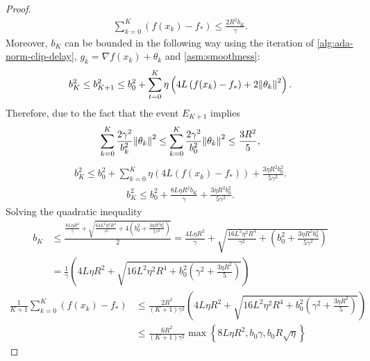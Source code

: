 \documentclass{article}
\begin{document}
\begin{proof}
    \begin{align}
        \sum\limits_{k=0}^{K}\left(f(x_k) - f_*\right) \leq  \frac{2R^2b_{K}}{\gamma}. \label{eq:dnjkfvjkdbfjhvbsjdcbsjd}
    \end{align}
    Moreover, $b_{K}$ can be bounded in the following way using the iteration of \cref{alg:ada-norm-clip-delay}, $g_k = \nabla f(x_k) + \theta_k$ and \cref{asm:smoothness}:
    \begin{align*}
        b_{K}^2 \leq b_{K+1}^2 \leq b_0^2 + \sum\limits_{t=0}^{K}\eta\left(4L\left(f(x_k) - f_*\right) + 2{\left\lVert\theta_k\right\rVert}^2\right).
    \end{align*}
    Therefore, due to the fact that the event $E_{K+1}$ implies 
    \begin{align*}
         \sum\limits_{k=0}^{K} \frac{2\gamma^2}{b_k^2}{\left\lVert\theta_k\right\rVert}^2 \leq \sum\limits_{k=0}^{K} \frac{2\gamma^2}{b_0^2}{\left\lVert\theta_k\right\rVert}^2 \leq \frac{3R^2}{5},
    \end{align*}
    \begin{align*}
        b_{K}^2 \leq b_0^2 + \sum\limits_{k=0}^{K}\eta\left(4L\left(f(x_k) - f_*\right)\right) + \frac{3\eta R^2b_0^2}{5\gamma^2}.
    \end{align*}
    \begin{align*}
        b_{K}^2 \leq b_0^2 + \frac{8L\eta R^2b_{K}}{\gamma} + \frac{3\eta R^2b_0^2}{5\gamma^2}.
    \end{align*}
    Solving the quadratic inequality
    \begin{align*}
        b_{K} &\leq \frac{\frac{8L\eta R^2}{\gamma} + \sqrt{\frac{64L^2\eta^2R^4}{\gamma^2} + 4\left(b_0^2 + \frac{3\eta R^2b_0^2}{5\gamma^2}\right)}}{2} = \frac{4L\eta R^2}{\gamma} + \sqrt{\frac{16L^2\eta^2 R^4}{\gamma^2} + \left(b_0^2 + \frac{3\eta R^2b_0^2}{5\gamma^2}\right)} \\ &=
        \frac{1}{\gamma}\left(4L\eta R^2 + \sqrt{16L^2\eta^2R^4 + b_0^2\left(\gamma^2 + \frac{3\eta R^2}{5}\right)}\right)
    \end{align*}
     
    \begin{align*}
        \frac{1}{K+1}\sum\limits_{k=0}^{K}\left(f(x_k) - f_*\right) &\leq \frac{2R^2}{(K+1)\gamma^2}\left(4L\eta R^2 + \sqrt{16L^2 \eta^2R^4 + b_0^2\left(\gamma^2 + \frac{3\eta R^2}{5}\right)}\right) \\& \leq \frac{6R^2}{(K+1)\gamma^2}\max\left\{8L\eta R^2, b_0\gamma, b_0R\sqrt{\eta}\right\}

\end{align*}
\end{proof}
\end{document}

